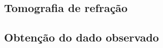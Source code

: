 




\subsection*{Tomografia de refração}

\subsection*{Obtenção do dado observado}

 
 
 
 
 
 
 
 
 
 
 
 
